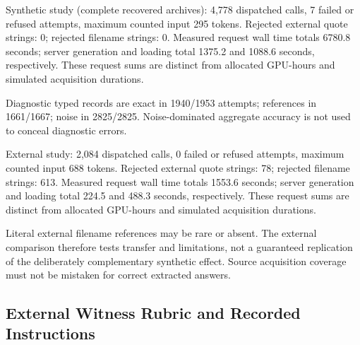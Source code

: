 Synthetic study (complete recovered archives): 4,778 dispatched calls, 7 failed or refused attempts, maximum counted input 295 tokens. Rejected external quote strings: 0; rejected filename strings: 0. Measured request wall time totals 6780.8 seconds; server generation and loading total 1375.2 and 1088.6 seconds, respectively. These request sums are distinct from allocated GPU-hours and simulated acquisition durations.

Diagnostic typed records are exact in 1940/1953 attempts; references in 1661/1667; noise in 2825/2825. Noise-dominated aggregate accuracy is not used to conceal diagnostic errors.

External study: 2,084 dispatched calls, 0 failed or refused attempts, maximum counted input 688 tokens. Rejected external quote strings: 78; rejected filename strings: 613. Measured request wall time totals 1553.6 seconds; server generation and loading total 224.5 and 488.3 seconds, respectively. These request sums are distinct from allocated GPU-hours and simulated acquisition durations.

Literal external filename references may be rare or absent. The external comparison therefore tests transfer and limitations, not a guaranteed replication of the deliberately complementary synthetic effect. Source acquisition coverage must not be mistaken for correct extracted answers.

\iflongversion

\subsection{External Witness Rubric and Recorded Instructions}

